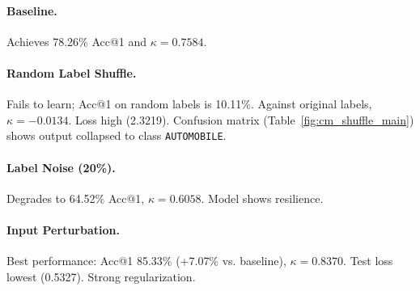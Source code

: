 \documentclass[10pt,twocolumn,letterpaper]{article}
\begin{document}
\begin{table*}[htbp!] %
    \centering
    \caption{Test set performance. "Loss", "Acc@1", "Acc@5" are on loader labels. "Cohen's $\kappa$" for "Shuffle" is vs. original labels. Best Acc@1, Acc@5, $\kappa$ bolded; lowest Loss (excl. Shuffle) bolded.}
    \label{tab:main_results}
\end{table*}

\paragraph{Baseline.} Achieves 78.26\% Acc@1 and $\kappa=0.7584$.
\paragraph{Random Label Shuffle.} Fails to learn; Acc@1 on random labels is 10.11\%. Against original labels, $\kappa=-0.0134$. Loss high (2.3219). Confusion matrix (Table~\ref{fig:cm_shuffle_main}) shows output collapsed to class \texttt{AUTOMOBILE}.
\paragraph{Label Noise (20\%).} Degrades to 64.52\% Acc@1, $\kappa=0.6058$. Model shows resilience.
\paragraph{Input Perturbation.} Best performance: Acc@1 85.33\% (+7.07\% vs. baseline), $\kappa=0.8370$. Test loss lowest (0.5327). Strong regularization.
\end{document}
